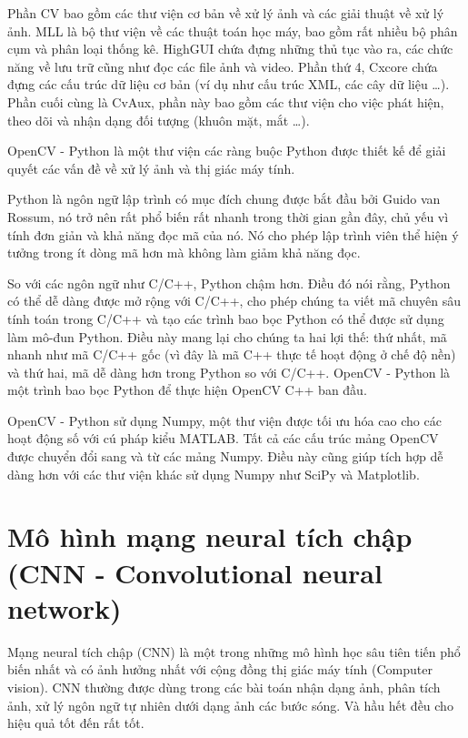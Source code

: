Phần CV bao gồm các thư viện cơ bản về xử lý ảnh và các giải thuật về xử lý ảnh.
MLL là bộ thư viện về các thuật toán học máy, bao gồm rất nhiều bộ phân cụm và phân
loại thống kê. HighGUI chứa đựng những thủ tục vào ra, các chức năng về lưu trữ cũng
như đọc các file ảnh và video. Phần thứ 4, Cxcore chứa đựng các cấu trúc dữ liệu
cơ bản (ví dụ như cấu trúc XML, các cây dữ liệu …). Phần cuối cùng là CvAux, phần này
bao gồm các thư viện cho việc phát hiện, theo dõi và nhận dạng đối tượng (khuôn mặt, mắt …).

OpenCV - Python là một thư viện các ràng buộc Python được thiết kế để giải quyết các vấn đề
về xử lý ảnh và thị giác máy tính.

Python là ngôn ngữ lập trình có mục đích chung được bắt đầu bởi Guido van Rossum,
nó trở nên rất phổ biến rất nhanh trong thời gian gần đây, chủ yếu vì tính đơn giản
và khả năng đọc mã của nó. Nó cho phép lập trình viên thể hiện ý tưởng trong ít dòng
mã hơn mà không làm giảm khả năng đọc.

So với các ngôn ngữ như C/C++, Python chậm hơn. Điều đó nói rằng, Python có thể dễ dàng
được mở rộng với C/C++, cho phép chúng ta viết mã chuyên sâu tính toán trong C/C++
và tạo các trình bao bọc Python có thể được sử dụng làm mô-đun Python.
Điều này mang lại cho chúng ta hai lợi thế: thứ nhất, mã nhanh như mã C/C++ gốc
(vì đây là mã C++ thực tế hoạt động ở chế độ nền) và thứ hai, mã dễ dàng hơn trong
Python so với C/C++. OpenCV - Python là một trình bao bọc Python để thực hiện OpenCV C++
ban đầu.

OpenCV - Python sử dụng Numpy, một thư viện được tối ưu hóa cao cho các hoạt động số với
cú pháp kiểu MATLAB. Tất cả các cấu trúc mảng OpenCV được chuyển đổi sang và từ các mảng
Numpy. Điều này cũng giúp tích hợp dễ dàng hơn với các thư viện khác sử dụng Numpy
như SciPy và Matplotlib.



\section{Mô hình mạng neural tích chập (CNN - Convolutional neural network)}

Mạng neural tích chập (CNN) là một trong những mô hình học sâu tiên tiến phổ biến nhất và
có ảnh hưởng nhất với cộng đồng thị giác máy tính (Computer vision). CNN thường được dùng
trong các bài toán nhận dạng ảnh, phân tích ảnh, xử lý ngôn ngữ tự nhiên dưới dạng ảnh các bước sóng.
Và hầu hết đều cho hiệu quả tốt đến rất tốt.


